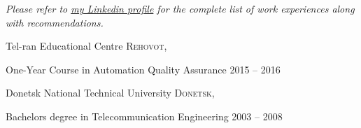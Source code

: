 \documentclass[10pt,a4paper]{article} %
\begin{document}

\begin{center}
\textit{Please refer to \href{http://www.linkedin.com/in/bakbukdibbuk}{my Linkedin profile} for the complete list of work experiences along with recommendations.}
\end{center}


\spacedhrule{-0.2em}{-0.4em} %



\headedsection %
{Tel-ran Educational Centre}
{\textsc{Rehovot, }}{

\headedsubsection %
{One-Year Course in Automation Quality Assurance}
{2015 -- 2016}
{\bodytext{}}
}


\headedsection %
{Donetsk National Technical University}
{\textsc{Donetsk, }}{

\headedsubsection %
{Bachelors degree in Telecommunication Engineering}
{2003 -- 2008} {}
}

\spacedhrule{0.5em}{-0.4em} %


\end{document}
